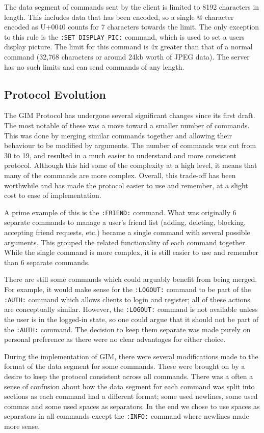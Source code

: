 The data segment of commands sent by the client is limited to 8192 characters in length. This includes data that has been encoded, so a single @ character encoded as \SLASH U+0040 counts for 7 characters towards the limit. The only exception to this rule is the \texttt{:SET DISPLAY\_PIC:} command, which is used to set a users display picture. The limit for this command is 4x greater than that of a normal command (32,768 characters or around 24kb worth of JPEG data). The server has no such limits and can send commands of any length.

\subsection{Protocol Evolution}

The GIM Protocol has undergone several significant changes since its first draft. The most notable of these was a move toward a smaller number of commands. This was done by merging similar commands together and allowing their behaviour to be modified by arguments. The number of commands was cut from 30 to 19, and resulted in a much easier to understand and more consistent protocol. Although this hid some of the complexity at a high level, it means that many of the commands are more complex. Overall, this trade-off has been worthwhile and has made the protocol easier to use and remember, at a slight cost to ease of implementation.

A prime example of this is the \texttt{:FRIEND:} command. What was originally 6 separate commands to manage a user's friend list (adding, deleting, blocking, accepting friend requests, etc.) became a single command with several possible arguments. This grouped the related functionality of each command together. While the single command is more complex, it is still easier to use and remember than 6 separate commands.

There are still some commands which could arguably benefit from being merged. For example, it would make sense for the \texttt{:LOGOUT:} command to be part of the \texttt{:AUTH:} command which allows clients to login and register; all of these actions are conceptually similar. However, the \texttt{:LOGOUT:} command is not available unless the user is in the logged-in state, so one could argue that it should not be part of the \texttt{:AUTH:} command. The decision to keep them separate was made purely on personal preference as there were no clear advantages for either choice. 

During the implementation of GIM, there were several modifications made to the format of the data segment for some commands. These were brought on by a desire to keep the protocol consistent across all commands. There was a often a sense of confusion about how the data segment for each command was split into sections as each command had a different format; some used newlines, some used commas and some used spaces as separators. In the end we chose to use spaces as separators in all commands except the \texttt{:INFO:} command where newlines made more sense. 

